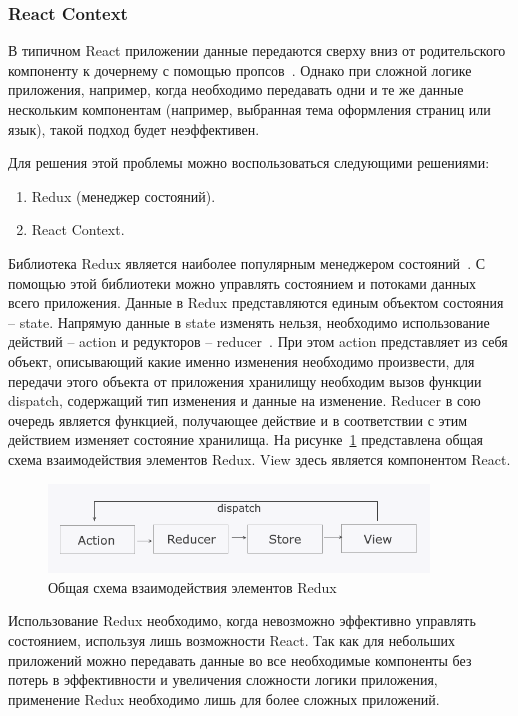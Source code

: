 \subsubsection{React Context}

В типичном React приложении данные передаются сверху вниз от родительского компоненту к дочернему с помощью пропсов~\cite{react}. Однако при сложной логике приложения, например, когда необходимо передавать одни и те же данные нескольким компонентам (например, выбранная тема оформления страниц или язык), такой подход будет неэффективен.

Для решения этой проблемы можно воспользоваться следующими решениями:

\begin{enumerate}
  \item Redux (менеджер состояний).
  \item React Context.
\end{enumerate}

Библиотека Redux является наиболее популярным менеджером состояний~\cite{redux}. С помощью этой библиотеки можно управлять состоянием и потоками данных всего приложения. Данные в Redux представляются единым объектом состояния -- state. Напрямую данные в state изменять нельзя, необходимо использование действий -- action и редукторов -- reducer~\cite{redux}. При этом action представляет из себя объект, описывающий какие именно изменения необходимо произвести, для передачи этого объекта от приложения хранилищу необходим вызов функции dispatch, содержащий тип изменения и данные на изменение. Reducer в сою очередь является функцией, получающее действие и в соответствии с этим действием изменяет состояние хранилища. На рисунке~\ref{img:react__redux} представлена общая схема взаимодействия элементов Redux. View здесь является компонентом React.

\begin{figure}[H]
  \centering
  \includegraphics[width=0.9\textwidth]{assets/images/theoretical2/redux.png}
  \caption{Общая схема взаимодействия элементов Redux}
  \label{img:react__redux}
\end{figure}

Использование Redux необходимо, когда невозможно эффективно управлять состоянием, используя лишь возможности React. Так как для небольших приложений можно передавать данные во все необходимые компоненты без потерь в эффективности и увеличения сложности логики приложения, применение Redux необходимо лишь для более сложных приложений.

